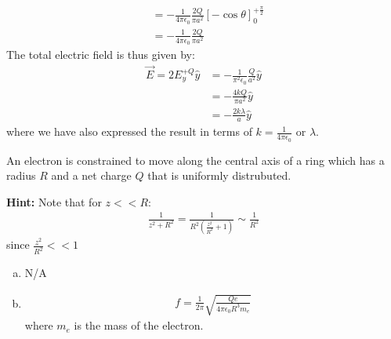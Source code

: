 \begin{solution}
\begin{align*}
&=-\frac{1}{4\pi\epsilon_0}\frac{2Q}{\pi a^2}[-\cos\theta ]_{0}^{+\frac{\pi}{2}}\\
&=-\frac{1}{4\pi\epsilon_0}\frac{2Q}{\pi a^2}
\end{align*}
The total electric field is thus given by:
\begin{align*}
\vec E=2E_y^{+Q}\hat y&=-\frac{1}{\pi^2\epsilon_0}\frac{Q}{a^2}\hat y\\
&=-\frac{4kQ}{\pi a^2}\hat y\\
&=-\frac{2k\lambda}{a}\hat y
\end{align*}
where we have also expressed the result in terms of $k=\frac{1}{4\pi\epsilon_0}$ or $\lambda$.
\end{solution}

\question An electron is constrained to move along the central axis of a ring which has a radius $R$ and a net charge $Q$ that is uniformly distrubuted.
\textbf{Hint:} Note that for $z<<R$:
\begin{align*}
\frac{1}{z^2+R^2}=\frac{1}{R^2\left(\frac{z^2}{R^2}+1 \right)}\sim\frac{1}{R^2}
\end{align*}
since $\frac{z^2}{R^2}<<1$
\begin{finalanswer}
\begin{enumerate}[(a)]
\item N/A
\item \begin{align*}
f =\frac{1}{2\pi}\sqrt{\frac{Qe}{4\pi\epsilon_0R^3m_e}}
\end{align*}
where $m_e$ is the mass of the electron.
\end{enumerate}
\end{finalanswer}
